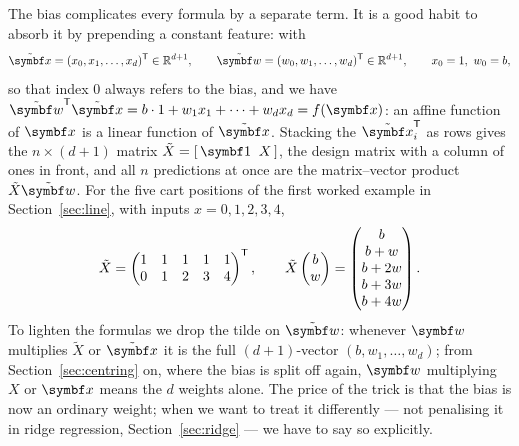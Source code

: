 \documentclass[11pt]{article}
\newcommand{\Xt}{\tilde X}
\newcommand{\xt}{\tilde{\x}}
\newcommand{\w}{\vect{w}}
\begin{document}
The bias complicates every formula by a separate term. It is a good habit to absorb it by prepending a constant
feature: with
\[
  \xt = (x_0, x_1, \dots, x_d)\T \in \R^{d+1}, \qquad \tilde{\w} = (w_0, w_1, \dots, w_d)\T \in \R^{d+1},
  \qquad x_0 = 1,\ w_0 = b,
\]
so that index $0$ always refers to the bias, and we have $\tilde{\w}\T\xt = b \cdot 1 + w_1 x_1 + \dots + w_d x_d = f(\x)$: an affine function of $\x$ is a linear
function of $\xt$. Stacking the $\xt_i\T$ as rows gives the $n \times (d+1)$ matrix $\Xt = [\,\vect{1} \;\; X\,]$, the
design matrix with a column of ones in front, and all $n$ predictions at once are the matrix--vector product
$\Xt\tilde{\w}$. For the five cart positions of the first worked example in Section~\ref{sec:line}, with inputs $x = 0, 1, 2, 3, 4$,
\[
  \Xt = \begin{pmatrix} 1 & 1 & 1 & 1 & 1 \\ 0 & 1 & 2 & 3 & 4 \end{pmatrix}\T, \qquad
  \Xt \begin{pmatrix} b \\ w \end{pmatrix} = \begin{pmatrix} b \\ b + w \\ b + 2w \\ b + 3w \\ b + 4w \end{pmatrix}.
\]
To lighten the formulas we drop the tilde on $\tilde{\w}$: whenever $\w$ multiplies $\Xt$ or $\xt$ it is the full
$(d+1)$-vector $(b, w_1, \dots, w_d)$; from Section~\ref{sec:centring} on, where the bias is split off again, $\w$
multiplying $X$ or $\x$ means the $d$ weights alone. The price of the trick is that the bias is now an ordinary weight;
when we want to treat it differently --- not penalising it in ridge regression, Section~\ref{sec:ridge} --- we have to say
so explicitly.
\end{document}
